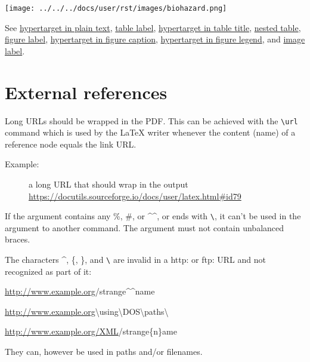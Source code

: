 \documentclass[a4paper]{article}
\newenvironment{DUlineblock}[1]{%
    \list{}{\setlength{\partopsep}{\parskip}
            \addtolength{\partopsep}{\baselineskip}
            \setlength{\topsep}{0pt}
            \setlength{\itemsep}{0.15\baselineskip}
            \setlength{\parsep}{0pt}
            \setlength{\leftmargin}{#1}}
    \raggedright
  }
  {\endlist}
\begin{document}
\texttt{[image: ../../../docs/user/rst/images/biohazard.png]}
\label{image-label}

See \hyperref[hypertarget-in-plain-text]{hypertarget in plain text},
\hyperref[table-label]{table label}, \hyperref[hypertarget-in-table-title]{hypertarget in table title},
\hyperref[nested-table]{nested table},
\hyperref[figure-label]{figure label}, \hyperref[hypertarget-in-figure-caption]{hypertarget in figure caption},
\hyperref[hypertarget-in-figure-legend]{hypertarget in figure legend}, and
\hyperref[image-label]{image label}.


\section{External references%
  \label{external-references}%
}

Long URLs should be wrapped in the PDF. This can be achieved with the
\texttt{\textbackslash{}url} command which is used by the LaTeX writer whenever the content
(name) of a reference node equals the link URL.

\begin{description}
\item[{Example:}] 
a long URL that should wrap in the output
\url{https://docutils.sourceforge.io/docs/user/latex.html\#id79}
\end{description}

If the argument contains any \textquotedbl{}\%\textquotedbl{}, \textquotedbl{}\#\textquotedbl{}, or \textquotedbl{}\textasciicircum{}\textasciicircum{}\textquotedbl{}, or ends with \texttt{\textbackslash{}}, it can't
be used in the argument to another command. The argument must not contain
unbalanced braces.

The characters \textasciicircum{}, \{, \}, and \texttt{\textbackslash{}} are invalid in a \textquotedbl{}http:\textquotedbl{} or \textquotedbl{}ftp:\textquotedbl{} URL
and not recognized as part of it:

\begin{DUlineblock}{0em}
\item[] \url{http://www.example.org}/strange\textasciicircum{}\textasciicircum{}name
\item[] \url{http://www.example.org}\textbackslash{}using\textbackslash{}DOS\textbackslash{}paths\textbackslash{}
\item[] \url{http://www.example.org/XML}/strange\{n\}ame
\end{DUlineblock}

They can, however be used in paths and/or filenames.
\end{document}
